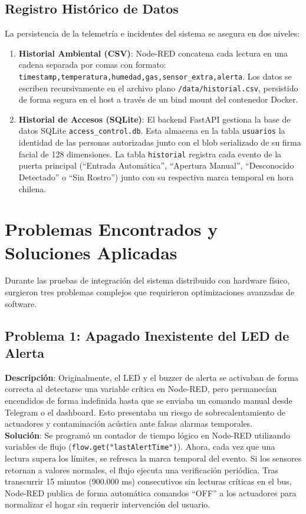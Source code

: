 \documentclass[12pt,letterpaper]{article}
\begin{document}
\subsection{Registro Histórico de Datos}
La persistencia de la telemetría e incidentes del sistema se asegura en dos niveles:
\begin{enumerate}
    \item \textbf{Historial Ambiental (CSV)}: Node-RED concatena cada lectura en una cadena separada por comas con formato: \texttt{timestamp,temperatura,humedad,gas,sensor\_extra,alerta}. Los datos se escriben recursivamente en el archivo plano \texttt{/data/historial.csv}, persistido de forma segura en el host a través de un bind mount del contenedor Docker.
    \item \textbf{Historial de Accesos (SQLite)}: El backend FastAPI gestiona la base de datos SQLite \texttt{access\_control.db}. Esta almacena en la tabla \texttt{usuarios} la identidad de las personas autorizadas junto con el blob serializado de su firma facial de 128 dimensiones. La tabla \texttt{historial} registra cada evento de la puerta principal (``Entrada Automática'', ``Apertura Manual'', ``Desconocido Detectado'' o ``Sin Rostro'') junto con su respectiva marca temporal en hora chilena.
\end{enumerate}

\newpage
\section{Problemas Encontrados y Soluciones Aplicadas}
Durante las pruebas de integración del sistema distribuido con hardware físico, surgieron tres problemas complejos que requirieron optimizaciones avanzadas de software.

\subsection{Problema 1: Apagado Inexistente del LED de Alerta}
\textbf{Descripción}: Originalmente, el LED y el buzzer de alerta se activaban de forma correcta al detectarse una variable crítica en Node-RED, pero permanecían encendidos de forma indefinida hasta que se enviaba un comando manual desde Telegram o el dashboard. Esto presentaba un riesgo de sobrecalentamiento de actuadores y contaminación acústica ante falsas alarmas temporales. \\
\textbf{Solución}: Se programó un contador de tiempo lógico en Node-RED utilizando variables de flujo (\texttt{flow.get("lastAlertTime")}). Ahora, cada vez que una lectura supera los límites, se refresca la marca temporal del evento. Si los sensores retornan a valores normales, el flujo ejecuta una verificación periódica. Tras transcurrir 15 minutos ($900.000$ ms) consecutivos sin lecturas críticas en el bus, Node-RED publica de forma automática comandos ``OFF'' a los actuadores para normalizar el hogar sin requerir intervención del usuario.
\end{document}
